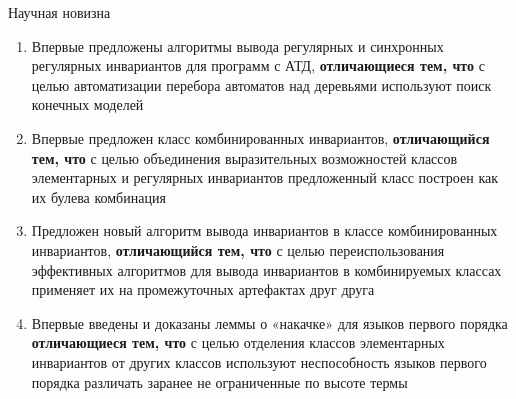 \documentclass[22pt,aspectratio=169]{beamer}
\begin{document}
\begin{framesection}{Научная новизна}
\begin{enumerate}
\item Впервые предложены алгоритмы вывода регулярных и синхронных
регулярных инвариантов для программ с АТД, \textbf{отличающиеся тем, что} с
целью автоматизации перебора автоматов над деревьями используют поиск
конечных моделей
\item Впервые предложен класс комбинированных инвариантов, \textbf{отличающийся
тем, что} с целью объединения выразительных возможностей классов
элементарных и регулярных инвариантов предложенный класс построен как
их булева комбинация
\item Предложен новый алгоритм вывода инвариантов в классе комбинированных
инвариантов, \textbf{отличающийся тем, что} с целью переиспользования
эффективных алгоритмов для вывода инвариантов в комбинируемых классах
применяет их на промежуточных артефактах друг друга
\item Впервые введены и доказаны леммы о «накачке» для языков первого
порядка \textbf{отличающиеся тем, что} с целью отделения классов элементарных
инвариантов от других классов используют неспособность языков первого
порядка различать заранее не ограниченные по высоте термы
\end{enumerate}
\end{framesection}
\end{document}
